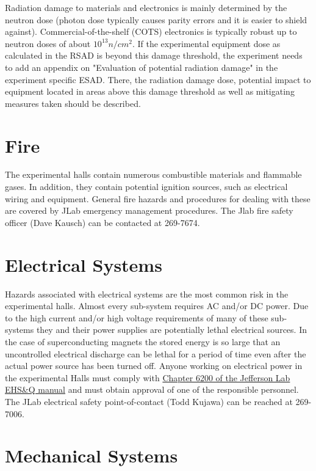 Radiation damage to materials and electronics is mainly determined by the neutron 
dose (photon dose typically causes parity errors and it is easier to shield against). 
Commercial-of-the-shelf (COTS) electronics is typically robust up to neutron 
doses of about $10^13 n/cm^2$. If the experimental equipment dose as calculated 
in the RSAD is beyond this damage threshold, the experiment needs to add 
an appendix on "Evaluation of potential radiation damage" in the experiment 
specific ESAD. There, the radiation damage dose, potential impact to equipment 
located in areas above this damage threshold as well as mitigating measures taken should be described.

\section{Fire}

	The experimental halls contain numerous combustible materials and flammable gases. 
In addition, they contain potential ignition sources, such as electrical wiring and equipment. 
General fire hazards and procedures for dealing with these are covered by JLab emergency 
management procedures. The Jlab fire safety officer (Dave Kausch) can be contacted at 269-7674.

\section{Electrical Systems}

	Hazards associated with electrical systems are the most common risk in the experimental halls. 
Almost every sub-system requires AC and/or DC power. Due to the high current and/or high voltage 
requirements of many of these sub-systems they and their power supplies are potentially lethal 
electrical sources. In the case of superconducting magnets the stored energy is so large that 
an uncontrolled electrical discharge can be lethal for a period of time even after the actual 
power source has been turned off.  Anyone working on electrical power in the experimental Halls 
must comply with \href{http://www.jlab.org/ehs/ehsmanual/manual/6200.html}{Chapter 6200 of the Jefferson Lab EHS\&Q manual}
and must obtain approval of one of the responsible personnel. 
The JLab electrical safety point-of-contact (Todd Kujawa) can be reached at 269-7006.

\section{Mechanical Systems}

